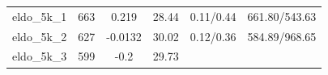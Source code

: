 \documentclass[]{article}
\begin{document}
\begin{longtable}[]{@{}cccccc@{}}
\begin{minipage}[t]{0.12\columnwidth}
eldo\_5k\_1\strut
\end{minipage} & \begin{minipage}[t]{0.07\columnwidth}\centering\strut
663\strut
\end{minipage} & \begin{minipage}[t]{0.12\columnwidth}\centering\strut
0.219\strut
\end{minipage} & \begin{minipage}[t]{0.14\columnwidth}\centering\strut
28.44\strut
\end{minipage} & \begin{minipage}[t]{0.17\columnwidth}\centering\strut
0.11/0.44\strut
\end{minipage} & \begin{minipage}[t]{0.22\columnwidth}\centering\strut
661.80/543.63\strut
\end{minipage}\tabularnewline
\begin{minipage}[t]{0.12\columnwidth}\centering\strut
eldo\_5k\_2\strut
\end{minipage} & \begin{minipage}[t]{0.07\columnwidth}\centering\strut
627\strut
\end{minipage} & \begin{minipage}[t]{0.12\columnwidth}\centering\strut
-0.0132\strut
\end{minipage} & \begin{minipage}[t]{0.14\columnwidth}\centering\strut
30.02\strut
\end{minipage} & \begin{minipage}[t]{0.17\columnwidth}\centering\strut
0.12/0.36\strut
\end{minipage} & \begin{minipage}[t]{0.22\columnwidth}\centering\strut
584.89/968.65\strut
\end{minipage}\tabularnewline
\begin{minipage}[t]{0.12\columnwidth}\centering\strut
eldo\_5k\_3\strut
\end{minipage} & \begin{minipage}[t]{0.07\columnwidth}\centering\strut
599\strut
\end{minipage} & \begin{minipage}[t]{0.12\columnwidth}\centering\strut
-0.2\strut
\end{minipage} & \begin{minipage}[t]{0.14\columnwidth}\centering\strut
29.73\strut
\end{minipage} & \begin{minipage}[t]{0.17\columnwidth}\centering\strut

\end{minipage}
\end{longtable}
\end{document}
